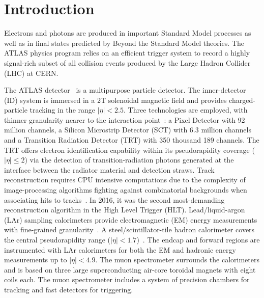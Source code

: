 \chapter{Introduction}

Electrons and photons are produced in important Standard Model processes as well as in final states predicted by Beyond the Standard Model theories. 
The ATLAS physics program relies on an efficient trigger system to record a highly signal-rich subset of all collision events produced by the Large Hadron Collider (LHC) at CERN.

The ATLAS detector~\cite{PERF-2007-01} is a multipurpose particle detector. 
The inner-detector (ID) system is immersed in a 2T solenoidal magnetic field and provides charged-particle tracking in the range $|\eta|<2.5$.  
Three technologies are employed, with thinner granularity nearer to the interaction point~\cite{PERF-2015-08,CERN-LHCC-97-016,Haywood:331064}: a Pixel Detector with 92 million channels, a Silicon Microstrip Detector (SCT) with 6.3 million channels and a Transition Radiation Detector (TRT) with 350 thousand 189 channels. 
The TRT offers electron identification capability within its pseudorapidity coverage ($|\eta|\leq 2$) via the detection of transition-radiation photons generated at the interface between the radiator material and detection straws. 
Track reconstruction requires CPU intensive computations due to the complexity of image-processing algorithms fighting against combinatorial backgrounds when associating hits to tracks~\cite{PERF-2015-08}. 
In 2016, it was the second most-demanding reconstruction algorithm in the High Level Trigger (HLT).
Lead/liquid-argon (LAr) sampling calorimeters provide electromagnetic (EM) energy measurements with fine-grained granularity~\cite{LARG-2009-01,larg_tdr}. 
A steel/scintillator-tile hadron calorimeter covers the central pseudorapidity range ($|\eta|< 1.7$)~\cite{TCAL-2017-01,tile_tdr}. 
The endcap and forward regions are instrumented with LAr calorimeters for both the EM and hadronic energy measurements up to $|\eta|< 4.9$. 
The muon spectrometer surrounds the calorimeters and is based on three large superconducting air-core toroidal magnets with eight coils each.  
The muon spectrometer includes a system of precision chambers for tracking and fast detectors for triggering. 

